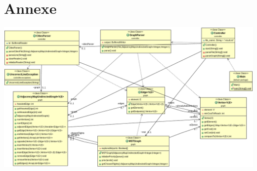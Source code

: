 \documentclass[11pt]{article}
\begin{document}
\newpage

\section{Annexe}
\begin{center}
\includegraphics[width=19.5cm, angle=90]{A.png}
\end{center}
\end{document}
